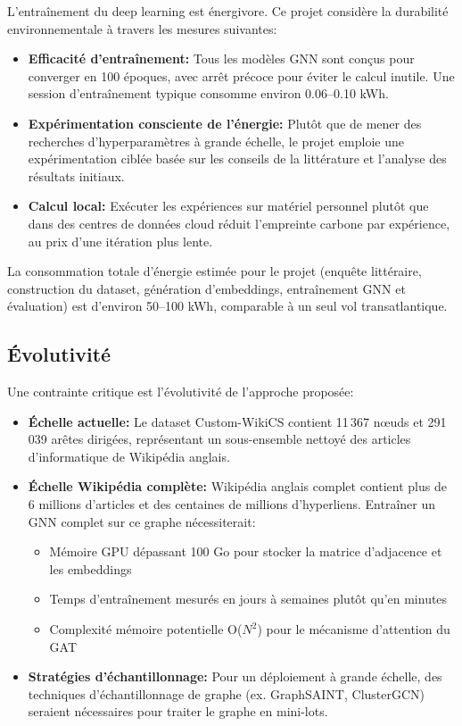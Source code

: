 L'entraînement du deep learning est énergivore. Ce projet considère la durabilité environnementale à travers les mesures suivantes:

\begin{itemize}
    \item \textbf{Efficacité d'entraînement:} Tous les modèles GNN sont conçus pour converger en 100 époques, avec arrêt précoce pour éviter le calcul inutile. Une session d'entraînement typique consomme environ 0.06--0.10 kWh.
    \item \textbf{Expérimentation consciente de l'énergie:} Plutôt que de mener des recherches d'hyperparamètres à grande échelle, le projet emploie une expérimentation ciblée basée sur les conseils de la littérature et l'analyse des résultats initiaux.
    \item \textbf{Calcul local:} Exécuter les expériences sur matériel personnel plutôt que dans des centres de données cloud réduit l'empreinte carbone par expérience, au prix d'une itération plus lente.
\end{itemize}

La consommation totale d'énergie estimée pour le projet (enquête littéraire, construction du dataset, génération d'embeddings, entraînement GNN et évaluation) est d'environ 50--100 kWh, comparable à un seul vol transatlantique.

\subsection{Évolutivité}

Une contrainte critique est l'évolutivité de l'approche proposée:

\begin{itemize}
    \item \textbf{Échelle actuelle:} Le dataset Custom-WikiCS contient 11\,367 nœuds et 291\,039 arêtes dirigées, représentant un sous-ensemble nettoyé des articles d'informatique de Wikipédia anglais.
    \item \textbf{Échelle Wikipédia complète:} Wikipédia anglais complet contient plus de 6 millions d'articles et des centaines de millions d'hyperliens. Entraîner un GNN complet sur ce graphe nécessiterait:
    \begin{itemize}
        \item Mémoire GPU dépassant 100 Go pour stocker la matrice d'adjacence et les embeddings
        \item Temps d'entraînement mesurés en jours à semaines plutôt qu'en minutes
        \item Complexité mémoire potentielle O($N^2$) pour le mécanisme d'attention du GAT
    \end{itemize}
    \item \textbf{Stratégies d'échantillonnage:} Pour un déploiement à grande échelle, des techniques d'échantillonnage de graphe (ex. GraphSAINT, ClusterGCN) seraient nécessaires pour traiter le graphe en mini-lots.
\end{itemize}

